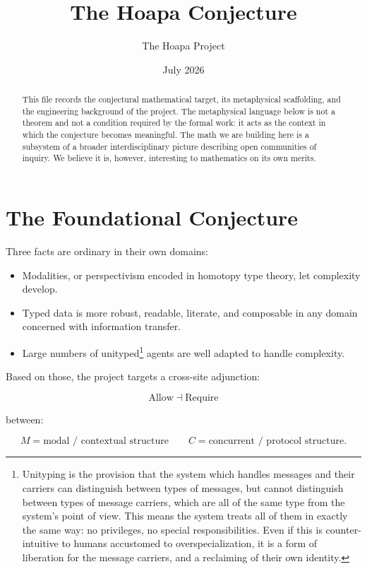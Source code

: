 \documentclass[11pt]{article}
\title{The Hoapa Conjecture}
\author{The Hoapa Project}
\date{July 2026}
\newcommand{\Allow}{\mathrm{Allow}}
\newcommand{\Require}{\mathrm{Require}}
\begin{document}
\maketitle

\begin{abstract}
This file records the conjectural mathematical target, its metaphysical
scaffolding, and the engineering background of the project. The metaphysical
language below is not a theorem and not a condition required by the formal
work: it acts as the context in which the conjecture becomes meaningful. The
math we are building here is a subsystem of a broader interdisciplinary
picture describing open communities of inquiry. We believe it is, however,
interesting to mathematics on its own merits.
\end{abstract}

\tableofcontents
\newpage

\section{The Foundational Conjecture}

Three facts are ordinary in their own domains:

\begin{itemize}
\item Modalities, or perspectivism encoded in homotopy type theory, let
complexity develop.
\item Typed data is more robust, readable, literate, and composable in any
domain concerned with information transfer.
\item Large numbers of unityped\footnote{Unityping is the provision that the
system which handles messages and their carriers can distinguish between types
of messages, but cannot distinguish between types of message carriers, which
are all of the same type from the system's point of view. This means the
system treats all of them in exactly the same way: no privileges, no special
responsibilities. Even if this is counter-intuitive to humans accustomed to
overspecialization, it is a form of liberation for the message carriers, and a
reclaiming of their own identity.} agents are well adapted to handle
complexity.
\end{itemize}

Based on those, the project targets a cross-site adjunction:

\[
\Allow \dashv \Require
\]

between:

\[
M = \text{modal / contextual structure}
\qquad
C = \text{concurrent / protocol structure}.
\]
\end{document}
